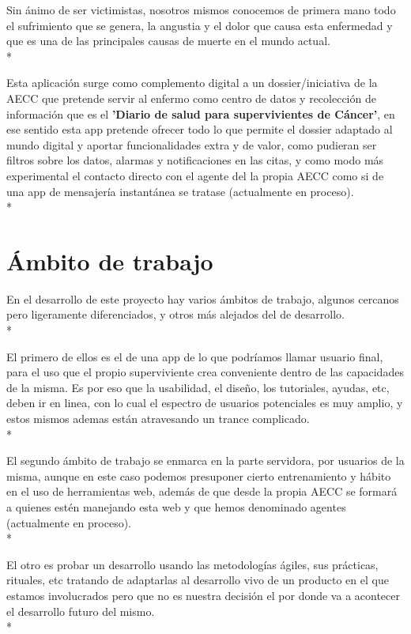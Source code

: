 \documentclass[../pfc.tex]{subfiles}
\begin{document}
Sin ánimo de ser victimistas, nosotros mismos conocemos de primera mano todo el sufrimiento que se genera, la angustia y el dolor que causa esta enfermedad y que es una de las principales causas de muerte en el mundo actual.\\*

Esta aplicación surge como complemento digital a un dossier/iniciativa de la AECC que pretende servir al enfermo como centro de datos y recolección de información que es el \textbf{'Diario de salud para supervivientes de Cáncer'}, en ese sentido esta app pretende ofrecer todo lo que permite el dossier adaptado al mundo digital y aportar funcionalidades extra y de valor, como pudieran ser filtros sobre los datos, alarmas y notificaciones en las citas, y como modo más experimental el contacto directo con el agente del la propia AECC como si de una app de mensajería instantánea se tratase (actualmente en proceso). \\*

\clearpage

\section{Ámbito de trabajo}

En el desarrollo de este proyecto hay varios ámbitos de trabajo, algunos cercanos pero ligeramente diferenciados, y otros más alejados del de desarrollo.\\*

El primero de ellos es el de una app de lo que podríamos llamar usuario final, para el uso que el propio superviviente crea conveniente dentro de las capacidades de la misma. Es por eso que la usabilidad, el diseño, los tutoriales, ayudas, etc, deben ir en linea, con lo cual el espectro de usuarios potenciales es muy amplio, y estos mismos ademas están atravesando un trance complicado.\\*

El segundo ámbito de trabajo se enmarca en la parte servidora, por usuarios de la misma, aunque en este caso podemos presuponer cierto entrenamiento y hábito en el uso de herramientas web, además de que desde la propia AECC se formará a quienes estén manejando esta web y que hemos denominado agentes (actualmente en proceso).\\*

El otro es probar un desarrollo usando las metodologías ágiles, sus prácticas, rituales, etc tratando de adaptarlas al desarrollo vivo de un producto en el que estamos involucrados pero que no es nuestra decisión el por donde va a acontecer el desarrollo futuro del mismo.\\*
\end{document}
